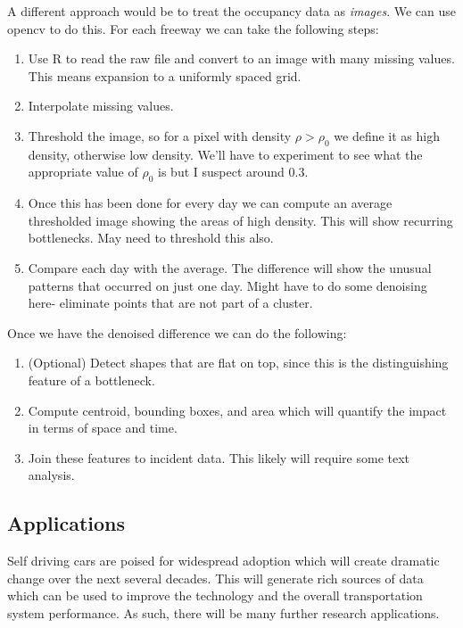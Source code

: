 \documentclass[12pt]{article}
\begin{document}
A different approach would be to treat the occupancy data as \emph{images}.
We can use opencv to do this. For each freeway we can take the following
steps:
\begin{enumerate}
    \item Use R to read the raw file and convert to an image with many missing
        values. This means expansion to a uniformly spaced grid.
    \item Interpolate missing values. 
    \item Threshold the image, so for a pixel with density $\rho >
        \rho_0$
        we define it as high density, otherwise low density. We'll
        have to experiment to see what the appropriate value of $\rho_0$ is
        but I suspect around 0.3.
    \item Once this has been done for every day we can compute an average
        thresholded image showing the areas of high density. This will show
        recurring bottlenecks. May need to threshold this also.
    \item Compare each day with the average. The difference will show the
        unusual patterns that occurred on just one day. Might have to do
        some denoising here- eliminate points that are not part of a 
        cluster.
\end{enumerate}

Once we have the denoised difference we can do the following:
\begin{enumerate}
    \item (Optional) Detect shapes that are flat on top, since this is the
        distinguishing feature of a bottleneck.
    \item Compute centroid, bounding boxes, and area which will quantify the impact
        in terms of space and time.
    \item Join these features to incident data. This likely will require some text
        analysis.
\end{enumerate}


\subsection{Applications}

Self driving cars are poised for widespread adoption which will create
dramatic change over the next several decades. This will generate rich
sources of data which can be used to improve the technology and the overall
transportation system performance.\cite{swan2015connected}
As such, there will be many further research applications.
\end{document}
